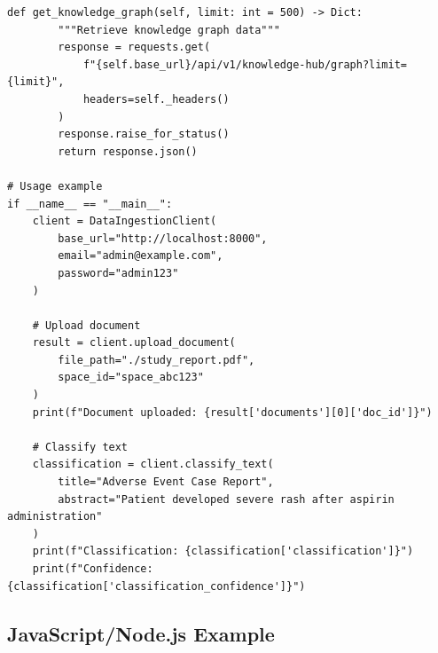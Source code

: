 \begin{lstlisting}[style=pythonstyle]
    def get_knowledge_graph(self, limit: int = 500) -> Dict:
        """Retrieve knowledge graph data"""
        response = requests.get(
            f"{self.base_url}/api/v1/knowledge-hub/graph?limit={limit}",
            headers=self._headers()
        )
        response.raise_for_status()
        return response.json()

# Usage example
if __name__ == "__main__":
    client = DataIngestionClient(
        base_url="http://localhost:8000",
        email="admin@example.com",
        password="admin123"
    )
    
    # Upload document
    result = client.upload_document(
        file_path="./study_report.pdf",
        space_id="space_abc123"
    )
    print(f"Document uploaded: {result['documents'][0]['doc_id']}")
    
    # Classify text
    classification = client.classify_text(
        title="Adverse Event Case Report",
        abstract="Patient developed severe rash after aspirin administration"
    )
    print(f"Classification: {classification['classification']}")
    print(f"Confidence: {classification['classification_confidence']}")
\end{lstlisting}

\subsection{JavaScript/Node.js Example}

